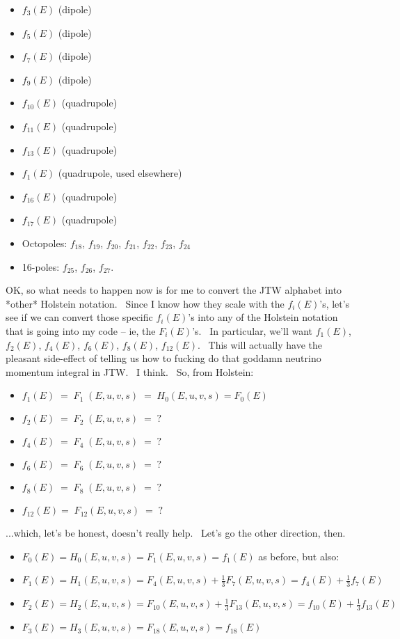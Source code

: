 \begin{itemize}
	\item $f_{3}(E)$  (dipole)
	\item $f_{5}(E)$  (dipole)
	\item $f_{7}(E)$  (dipole)
	\item $f_{9}(E)$  (dipole)
	\item $f_{10}(E)$ (quadrupole)
	\item $f_{11}(E)$ (quadrupole)
	\item $f_{13}(E)$ (quadrupole)
	\item $f_{1}(E)$  (quadrupole, used elsewhere)
	\item $f_{16}(E)$ (quadrupole)
	\item $f_{17}(E)$ (quadrupole)
	\item Octopoles:  $f_{18}$, $f_{19}$, $f_{20}$, $f_{21}$, $f_{22}$, $f_{23}$, $f_{24}$
	\item 16-poles:   $f_{25}$, $f_{26}$, $f_{27}$.
\end{itemize}

OK, so what needs to happen now is for me to convert the JTW alphabet into *other* Holstein notation.  Since I know how they scale with the $f_i(E)$'s, let's see if we can convert those specific $f_i(E)$'s into any of the Holstein notation that is going into my code -- ie, the $F_i(E)$'s.  In particular, we'll want $f_1(E)$, $f_2(E)$, $f_4(E)$, $f_6(E)$, $f_8(E)$, $f_12(E)$.  This will actually have the pleasant side-effect of telling us how to fucking do that goddamn neutrino momentum integral in JTW.  I think.  So, from Holstein:

\begin{itemize}
	\item $f_1(E) \; = \; F_1\;(E, u, v, s) \; = \; H_0(E, u, v, s) = F_0(E) $
	\item $f_2(E) \; = \; F_2\;(E, u, v, s) \; = \; ? $
	\item $f_4(E) \; = \; F_4\;(E, u, v, s) \; = \; ? $
	\item $f_6(E) \; = \; F_6\;(E, u, v, s) \; = \; ? $
	\item $f_8(E) \; = \; F_8\;(E, u, v, s) \; = \; ? $
	\item $f_{12}(E) = \; F_{12}(E, u, v, s)\; = \; ? $
\end{itemize}

...which, let's be honest, doesn't really help.  Let's go the other direction, then.

\begin{itemize}
	\item $ F_0(E) = H_0(E, u, v, s) = F_1(E, u, v, s)    = f_1(E) $    as before, but also:
	\item $ F_1(E) = H_1(E, u, v, s) = F_4(E, u, v, s) + \frac{1}{3} F_7(E, u, v, s)  = f_4(E) + \frac{1}{3} f_7(E) $
	\item $ F_2(E) = H_2(E, u, v, s) = F_{10}(E, u, v, s) + \frac{1}{3} F_{13}(E, u, v, s) = f_{10}(E) + \frac{1}{3} f_{13}(E) $ 
	\item $ F_3(E) = H_3(E, u, v, s) = F_{18}(E, u, v, s) = f_{18}(E)$ 
\end{itemize}

